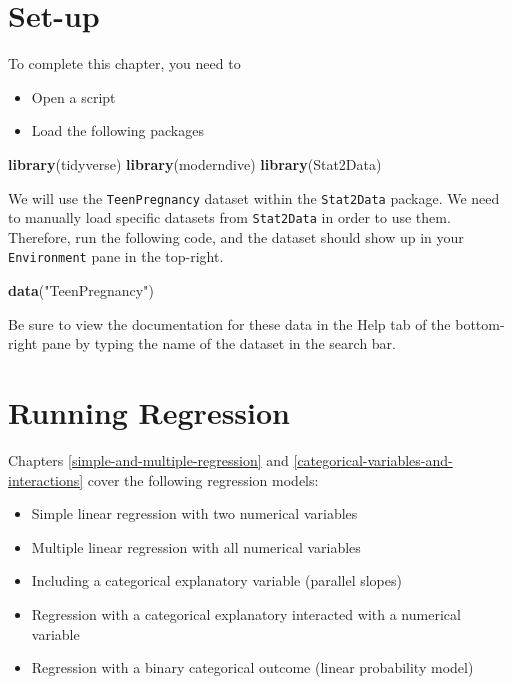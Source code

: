\documentclass[
]{book}
\newenvironment{Shaded}{\begin{snugshade}}{\end{snugshade}}
\newcommand{\KeywordTok}[1]{\textcolor[rgb]{0.13,0.29,0.53}{\textbf{#1}}}
\newcommand{\NormalTok}[1]{#1}
\newcommand{\StringTok}[1]{\textcolor[rgb]{0.31,0.60,0.02}{#1}}
\providecommand{\tightlist}{%
  \setlength{\itemsep}{0pt}\setlength{\parskip}{0pt}}
\begin{document}
\hypertarget{set-up}{%
\section{Set-up}\label{set-up}}

To complete this chapter, you need to

\begin{itemize}
\tightlist
\item
  Open a script
\item
  Load the following packages
\end{itemize}

\begin{Shaded}
\begin{Highlighting}[]
\KeywordTok{library}\NormalTok{(tidyverse)}
\KeywordTok{library}\NormalTok{(moderndive)}
\KeywordTok{library}\NormalTok{(Stat2Data)}
\end{Highlighting}
\end{Shaded}

We will use the \texttt{TeenPregnancy} dataset within the \texttt{Stat2Data} package. We need to manually load specific datasets from \texttt{Stat2Data} in order to use them. Therefore, run the following code, and the dataset should show up in your \texttt{Environment} pane in the top-right.

\begin{Shaded}
\begin{Highlighting}[]
\KeywordTok{data}\NormalTok{(}\StringTok{"TeenPregnancy"}\NormalTok{)}
\end{Highlighting}
\end{Shaded}

Be sure to view the documentation for these data in the Help tab of the bottom-right pane by typing the name of the dataset in the search bar.

\hypertarget{running-regression}{%
\section{Running Regression}\label{running-regression}}

Chapters \ref{simple-and-multiple-regression} and \ref{categorical-variables-and-interactions} cover the following regression models:

\begin{itemize}
\tightlist
\item
  Simple linear regression with two numerical variables
\item
  Multiple linear regression with all numerical variables
\item
  Including a categorical explanatory variable (parallel slopes)
\item
  Regression with a categorical explanatory interacted with a numerical variable
\item
  Regression with a binary categorical outcome (linear probability model)
\end{itemize}
\end{document}
